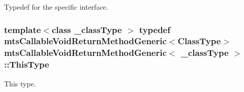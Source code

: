 Typedef for the specific interface. \hypertarget{classmts_callable_void_return_method_generic_a0c47816060134c2ec22f9287de913cc5}{
\subsubsection[{This\-Type}]{\setlength{\rightskip}{0pt plus 5cm}template$<$class \-\_\-class\-Type $>$ typedef {\bf mts\-Callable\-Void\-Return\-Method\-Generic}$<${\bf Class\-Type}$>$ {\bf mts\-Callable\-Void\-Return\-Method\-Generic}$<$ \-\_\-class\-Type $>$\-::{\bf This\-Type}}}\label{classmts_callable_void_return_method_generic_a0c47816060134c2ec22f9287de913cc5}
This type. 

